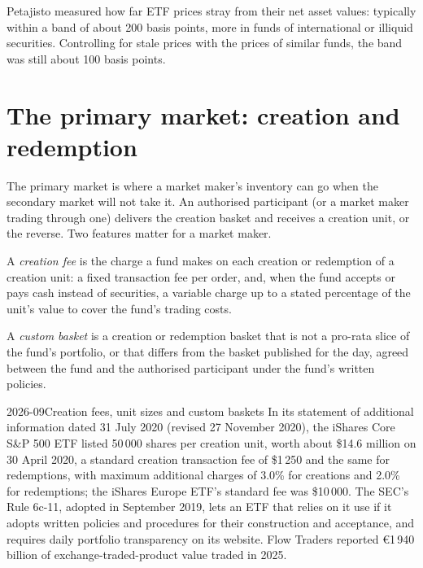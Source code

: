 Petajisto measured how far ETF prices stray from their net asset values: typically within a band of about 200 basis points, more in funds of
international or illiquid securities. Controlling for stale prices with the prices of similar funds, the band was still about 100 basis points.

\section{The primary market: creation and redemption}

The primary market is where a market maker's inventory can go when the secondary market will not take it. An authorised participant (or a market
maker trading through one) delivers the creation basket and receives a creation unit, or the reverse. Two features matter for a market maker.

\begin{definition}\label{def:hf:etf-market-making:fee}
A \emph{creation fee} is the charge a fund makes on each creation or redemption of a creation unit: a fixed transaction fee per
order, and, when the fund accepts or pays cash instead of securities, a variable charge up to a stated percentage of the unit's value to cover the
fund's trading costs.
\end{definition}

\begin{definition}\label{def:hf:etf-market-making:custom}
A \emph{custom basket} is a creation or redemption basket that is not a pro-rata slice of the fund's portfolio, or that differs
from the basket published for the day, agreed between the fund and the authorised participant under the fund's written policies.
\end{definition}

\begin{dated}{2026-09}{Creation fees, unit sizes and custom baskets}\label{dat:hf:etf-market-making:fees}
In its statement of additional information dated 31 July 2020 (revised 27 November 2020), the iShares Core S\&P 500 ETF listed 50\,000 shares per
creation unit, worth about \$14.6 million on 30 April 2020, a standard creation transaction fee of \$1\,250 and the same for redemptions, with maximum
additional charges of 3.0\% for creations and 2.0\% for redemptions; the iShares Europe ETF's standard fee was \$10\,000. The SEC's Rule 6c-11,
adopted in September 2019, lets an ETF that relies on it use  if it adopts written policies and procedures for their construction and
acceptance, and requires daily portfolio transparency on its website. Flow Traders reported \euro1\,940 billion of exchange-traded-product value traded
in 2025.
\end{dated}


